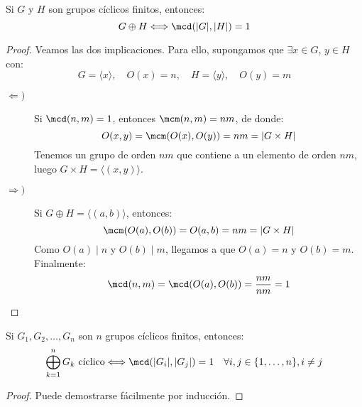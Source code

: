 \begin{prop}
    Si $G$ y $H$ son grupos cíclicos finitos, entonces:
    \begin{equation*}
        G\oplus H \Longleftrightarrow \mcd(|G|,|H|) = 1
    \end{equation*}
    \begin{proof}
        Veamos las dos implicaciones. Para ello, supongamos que $\exists x\in G$, $y\in H$ con:
        \begin{equation*}
            G = \langle x \rangle,  \quad O(x) = n, \quad H = \langle y \rangle , \quad O(y) = m
        \end{equation*}
        \begin{description}
            \item [$\Longleftarrow)$] Si $\mcd(n,m) = 1$, entonces $\mcm(n,m) = nm$, de donde:
                \begin{equation*}
                    O(x,y) = \mcm(O(x), O(y)) = nm = |G\times H|
                \end{equation*}
                Tenemos un grupo de orden $nm$ que contiene a un elemento de orden $nm$, luego $G\times H = \langle (x,y) \rangle $.
            \item [$\Longrightarrow)$] Si $G\oplus H = \langle (a,b) \rangle $, entonces:
                \begin{equation*}
                    \mcm(O(a), O(b)) = O(a,b) = nm = |G\times H|
                \end{equation*}
                Como $O(a) \mid n$ y $O(b) \mid m$, llegamos a que $O(a) = n$ y $O(b) = m$. Finalmente:
                \begin{equation*}
                    \mcd(n,m) = \mcd(O(a),O(b)) = \dfrac{nm}{nm} = 1
                \end{equation*}
        \end{description}
    \end{proof}
\end{prop}

\begin{prop}
    Si $G_1,G_2,\ldots, G_n$ son $n$ grupos cíclicos finitos, entonces:
    \begin{equation*}
        \bigoplus_{k=1}^n G_k \text{\ cíclico} \Longleftrightarrow \mcd(|G_i|,|G_j|) = 1 \quad \forall i,j \in \{1,\ldots,n\}, i\neq j
    \end{equation*}
    \begin{proof}
        Puede demostrarse fácilmente por inducción.
    \end{proof}
\end{prop}

